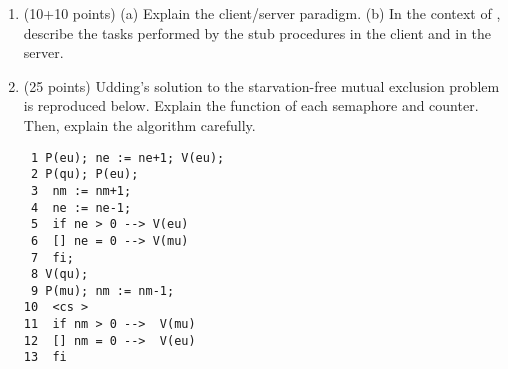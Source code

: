 \begin{enumerate}
\item (10+10 points)
(a) Explain the client/server paradigm.  (b) In the context of \RPC,
describe the tasks performed by the stub procedures in the client and
in the server.

\item (25 points) Udding's solution to the starvation-free mutual
exclusion problem is reproduced below.  Explain the function of each
semaphore and counter.  Then, explain the algorithm carefully.

\begin{verbatim}
 1 P(eu); ne := ne+1; V(eu);
 2 P(qu); P(eu);	    
 3	nm := nm+1;	    
 4	ne := ne-1;	    
 5	if ne > 0 --> V(eu) 
 6	[] ne = 0 --> V(mu) 
 7	fi;		    
 8 V(qu);		    
 9 P(mu); nm := nm-1;	    
10	<cs >		    
11	if nm > 0 -->  V(mu)
12	[] nm = 0 -->  V(eu)
13	fi		    
\end{verbatim}

\end{enumerate}

